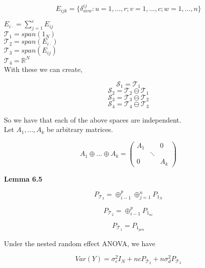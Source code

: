 \documentclass[11pt,fleqn]{book} %
\begin{document}
		$$E_{ijk} = \{\delta^{ij}_{uvw}: u = 1, \dots, r; v = 1, \dots, c; w = 1, \dots, n \} $$

$E_{i \cdot} = \sum^c_{j=1} E_{ij}$\\


$\mathcal{T}_1 = span(1_N)$\\
$\mathcal{T}_2 = span(E_{i\cdot})$\\
$\mathcal{T}_3 = span(E_{ij})$\\
$\mathcal{T}_4 = \mathbb{R}^N$\\

With these we can create, 

		$$\mathcal{S}_1 = \mathcal{T}_1 $$
		$$\mathcal{S}_2 = \mathcal{T}_2 \ominus \mathcal{T}_1 $$
		$$\mathcal{S}_3 = \mathcal{T}_3 \ominus \mathcal{T}_2 $$
		$$\mathcal{S}_4 = \mathcal{T}_4 \ominus \mathcal{T}_3 $$

So we have that each of the above spaces are independent.\\

Let $A_1, \dots, A_k$ be arbitrary matrices.

		$$A_1 \oplus \dots \oplus A_k = \begin{pmatrix}
			A_1 & & 0\\
			 & \ddots & \\
			 0 & & A_k
		\end{pmatrix} $$


\textbf{Lemma 6.5}

		$$P_{\mathcal{T}_3} = \oplus^p_{i-1} \oplus^n_{j=1} P_{1_N} $$

		$$P_{\mathcal{T}_2} = \oplus^p_{i-1}  P_{1_{nc}} $$

		$$P_{\mathcal{T}_1} =  P_{1_{pcn}} $$


\begin{theorem}
	Under the nested random effect ANOVA, we have

			$$Var(Y) = \sigma^2_e I_N + nc P_{\mathcal{T}_2} + n \sigma_d^2 P_{\mathcal{T}_3}$$
\end{theorem}
\end{document}

